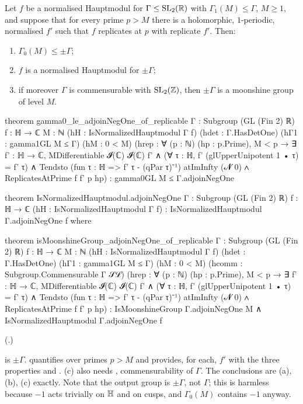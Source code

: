 \begin{theorem}\label{ch16:thm:gamma0}
Let $f$ be a normalised Hauptmodul for $\Gamma\le\mathrm{SL}_2(\mathbb{R})$ with $\Gamma_1(M)\le\Gamma$, $M\ge1$, and suppose that for
every prime $p>M$ there is a holomorphic, $1$-periodic, normalised $f'$ such that $f$ replicates at $p$ with replicate
$f'$.  Then:
\begin{enumerate}[label=(\alph*)]
\item $\Gamma_0(M)\le\pm\Gamma$;
\item $f$ is a normalised Hauptmodul for $\pm\Gamma$;
\item if moreover $\Gamma$ is commensurable with $\mathrm{SL}_2(\mathbb{Z})$, then $\pm\Gamma$ is a moonshine group of level $M$.
\end{enumerate}
\end{theorem}
\begin{leancode}
theorem gamma0_le_adjoinNegOne_of_replicable {Γ : Subgroup (GL (Fin 2) ℝ)} {f : ℍ → ℂ} {M : ℕ}
    (hH : IsNormalizedHauptmodul Γ f) (hdet : Γ.HasDetOne) (hΓ1 : gamma1GL M ≤ Γ) (hM : 0 < M)
    (hrep : ∀ (p : ℕ) (hp : p.Prime), M < p → ∃ f' : ℍ → ℂ,
      MDifferentiable 𝓘(ℂ) 𝓘(ℂ) f' ∧ (∀ τ : ℍ, f' (glUpperUnipotent 1 • τ) = f' τ) ∧
      Tendsto (fun τ : ℍ => f' τ - (qPar τ)⁻¹) atImInfty (𝓝 0) ∧ ReplicatesAtPrime f f' p hp) :
    gamma0GL M ≤ Γ.adjoinNegOne

theorem IsNormalizedHauptmodul.adjoinNegOne {Γ : Subgroup (GL (Fin 2) ℝ)} {f : ℍ → ℂ}
    (hH : IsNormalizedHauptmodul Γ f) : IsNormalizedHauptmodul Γ.adjoinNegOne f where

theorem isMoonshineGroup_adjoinNegOne_of_replicable {Γ : Subgroup (GL (Fin 2) ℝ)} {f : ℍ → ℂ}
    {M : ℕ} (hH : IsNormalizedHauptmodul Γ f) (hdet : Γ.HasDetOne) (hΓ1 : gamma1GL M ≤ Γ)
    (hM : 0 < M) (hcomm : Subgroup.Commensurable Γ 𝒮ℒ)
    (hrep : ∀ (p : ℕ) (hp : p.Prime), M < p → ∃ f' : ℍ → ℂ,
      MDifferentiable 𝓘(ℂ) 𝓘(ℂ) f' ∧ (∀ τ : ℍ, f' (glUpperUnipotent 1 • τ) = f' τ) ∧
      Tendsto (fun τ : ℍ => f' τ - (qPar τ)⁻¹) atImInfty (𝓝 0) ∧ ReplicatesAtPrime f f' p hp) :
    IsMoonshineGroup Γ.adjoinNegOne M ∧ IsNormalizedHauptmodul Γ.adjoinNegOne f
\end{leancode}
(.)
\begin{dictionary}
 is $\pm\Gamma$.   quantifies over primes $p>M$ and provides, for each, $f'$ with the
three properties and .  (c) also needs , commensurability of $\Gamma$.
The conclusions are (a), (b), (c) exactly.  Note that the output group is $\pm\Gamma$, not $\Gamma$; this is harmless
because $-1$ acts trivially on $\mathbb{H}$ and on cusps, and $\Gamma_0(M)$ contains $-1$ anyway.
\end{dictionary}
